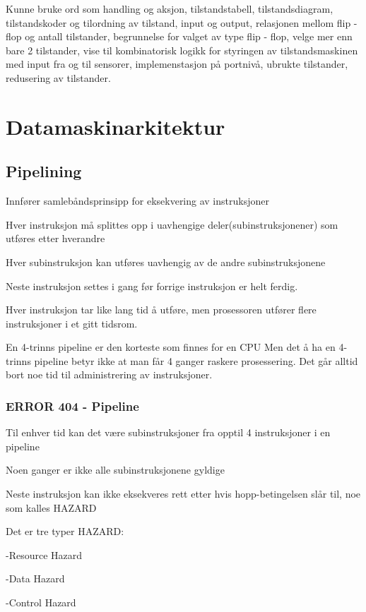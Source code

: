 \documentclass{article}
\begin{document}
	Kunne bruke ord som handling og aksjon, tilstandstabell, tilstandsdiagram, tilstandskoder og tilordning av tilstand, input og output, relasjonen mellom flip - flop og antall tilstander, begrunnelse for valget av type flip - flop,	velge mer enn bare 2 tilstander, vise til kombinatorisk logikk for styringen av tilstandsmaskinen med input fra og til sensorer, implemenstasjon på portnivå, ubrukte tilstander, redusering av tilstander.
	
	\section{Datamaskinarkitektur}
	\subsection{Pipelining}
	
	Innfører samlebåndsprinsipp for eksekvering av instruksjoner
	
	Hver instruksjon må splittes opp i uavhengige deler(subinstruksjonener) som utføres etter hverandre
	
	Hver subinstruksjon kan utføres uavhengig av de andre subinstruksjonene 
	
	Neste instruksjon settes i gang før forrige instruksjon er helt ferdig.
	
	Hver instruksjon tar like lang tid å utføre, men prosessoren utfører flere instruksjoner i et gitt tidsrom. 
	
	En 4-trinns pipeline er den korteste som finnes for en CPU
	Men det å ha en 4-trinns pipeline betyr ikke at man får 4 ganger raskere prosessering. Det går alltid bort noe tid til administrering av instruksjoner.
	
	\subsubsection{ERROR 404 - Pipeline}
	
	Til enhver tid kan det være subinstruksjoner fra opptil 4 instruksjoner i en pipeline
	
	Noen ganger er ikke alle subinstruksjonene gyldige 
	
	Neste instruksjon kan ikke eksekveres rett etter hvis hopp-betingelsen slår til, noe som kalles HAZARD
	
	Det er tre typer HAZARD:
	
	-Resource Hazard
	
	-Data Hazard
	
	-Control Hazard
	
\end{document}
